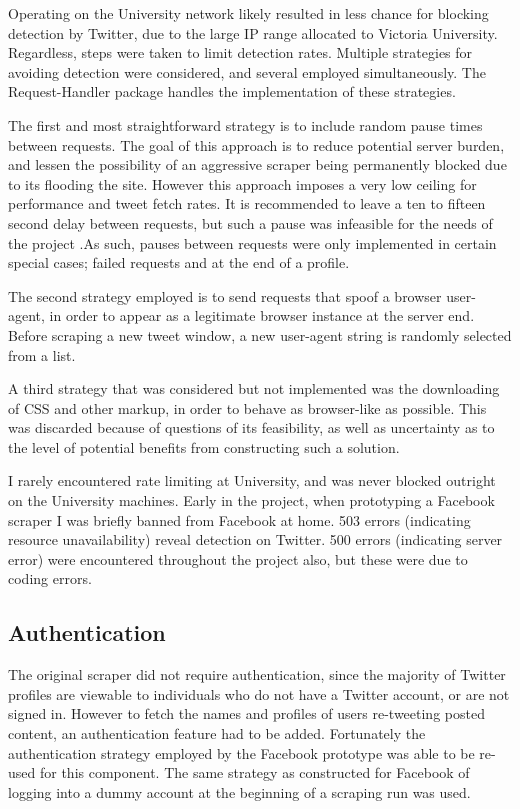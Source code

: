 Operating on the University network likely resulted in less chance for blocking detection by Twitter, due to the large IP range allocated to Victoria University. Regardless, steps were taken to limit detection rates. Multiple strategies for avoiding detection were considered, and several employed simultaneously. The Request-Handler package handles the implementation of these strategies.

The first and most straightforward strategy is to include random pause times between requests. The goal of this approach is to reduce potential server burden, and lessen the possibility of an aggressive scraper being permanently blocked due to its flooding the site. However this approach imposes a very low ceiling for performance and tweet fetch rates. It is recommended to leave a ten to fifteen second delay between requests, but such a pause was infeasible for the needs of the project \cite{howto_scrape}.As such, pauses between requests were only implemented in certain special cases; failed requests and at the end of a profile. 

The second strategy employed is to send requests that spoof a browser user-agent, in order to appear as a legitimate browser instance at the server end. Before scraping a new tweet window, a new user-agent string is randomly selected from a list. 

A third strategy that was considered but not implemented was the downloading of CSS and other markup, in order to behave as browser-like as possible. This was discarded because of questions of its feasibility, as well as uncertainty as to the level of potential benefits from constructing such a solution. 

I rarely encountered rate limiting at University, and was never blocked outright on the University machines. Early in the project, when prototyping a Facebook scraper I was briefly banned from Facebook at home. 503 errors (indicating resource unavailability) reveal detection on Twitter. 500 errors (indicating server error)  were encountered throughout the project also, but these were due to coding errors. 

\subsection{Authentication}

The original scraper did not require authentication, since the majority of Twitter profiles are viewable to individuals who do not have a Twitter account, or are not signed in. However to fetch the names and profiles of users re-tweeting posted content, an authentication feature had to be added. Fortunately the authentication strategy employed by the Facebook prototype was able to be re-used for this component. The same strategy as constructed for Facebook of logging into a dummy account at the beginning of a scraping run was used.  

